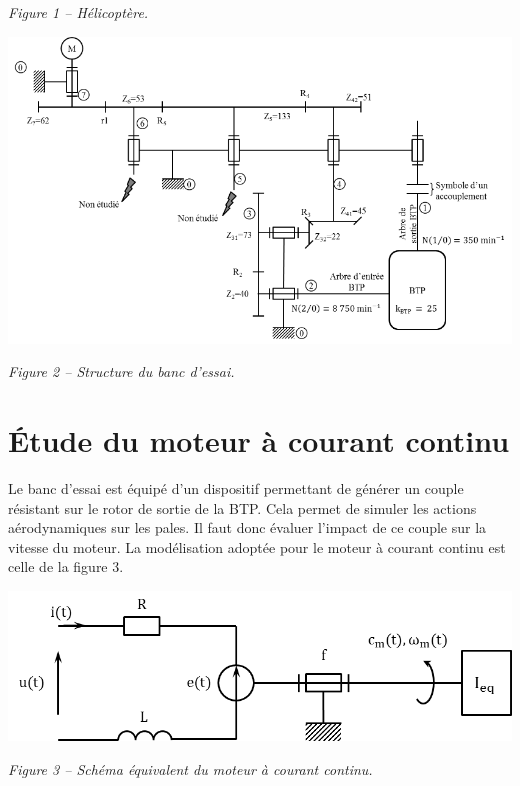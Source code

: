 \documentclass[10pt,fleqn]{article} %
\begin{document}
\begin{multicols}{2}
\begin{center}
\textit{Figure 1 -- Hélicoptère.}
\end{center}


\begin{center}
\includegraphics[width=.8\linewidth]{images/fig_04}

\textit{Figure 2 -- Structure du banc d'essai.}
\end{center}

\section*{Étude du moteur à courant continu}
Le banc d'essai est équipé d'un dispositif permettant de générer un couple résistant sur le rotor de sortie de la BTP. Cela permet de simuler les actions aérodynamiques sur les pales. Il faut donc évaluer l'impact de ce couple sur la vitesse du moteur. 
La modélisation adoptée pour le moteur à courant continu est celle de la figure 3.
 
\begin{center}
\includegraphics[width=.8\linewidth]{images/fig_05}

\textit{Figure 3 -- Schéma équivalent du moteur à courant continu.}
\end{center}




\end{multicols}
\end{document}
